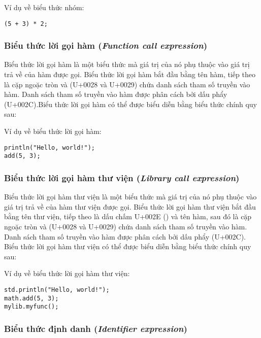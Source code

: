 \regexgroupexpr

\noindent Ví dụ về biểu thức nhóm:
\begin{lstlisting}[]
(5 + 3) * 2;
\end{lstlisting}

\subsubsection{Biểu thức lời gọi hàm (\textit{Function call expression})}

    Biểu thức lời gọi hàm là một biểu thức mà giá trị của nó phụ thuộc vào giá trị trả về của hàm được gọi. Biểu thức lời gọi hàm bắt đầu bằng tên hàm, tiếp theo là cặp ngoặc tròn \kw{(} và \kw{)} (U+0028 và U+0029) chứa danh sách tham số truyền vào hàm. Danh sách tham số truyền vào hàm được phân cách bởi dấu phẩy \kw{,} (U+002C).Biểu thức lời gọi hàm có thể được biểu diễn bằng biểu thức chính quy sau:

\regexfuncallexpr

\noindent Ví dụ về biểu thức lời gọi hàm:
\begin{lstlisting}[]
println("Hello, world!");
add(5, 3);
\end{lstlisting}

\subsubsection{Biểu thức lời gọi hàm thư viện (\textit{Library call expression})}

Biểu thức lời gọi hàm thư viện là một biểu thức mà giá trị của nó phụ thuộc vào giá trị trả về của hàm thư viện được gọi. Biểu thức lời gọi hàm thư viện bắt đầu bằng tên thư viện, tiếp theo là dấu chấm U+002E () và tên hàm, sau đó là cặp ngoặc tròn \kw{(} và \kw{)} (U+0028 và U+0029) chứa danh sách tham số truyền vào hàm. Danh sách tham số truyền vào hàm được phân cách bởi dấu phẩy \kw{,} (U+002C). Biểu thức lời gọi hàm thư viện có thể được biểu diễn bằng biểu thức chính quy sau:

\regexlibfuncallexpr

\noindent Ví dụ về biểu thức lời gọi hàm thư viện:
\begin{lstlisting}[]
std.println("Hello, world!");
math.add(5, 3);
mylib.myfunc();
\end{lstlisting}

\subsubsection{Biểu thức định danh (\textit{Identifier expression})}

